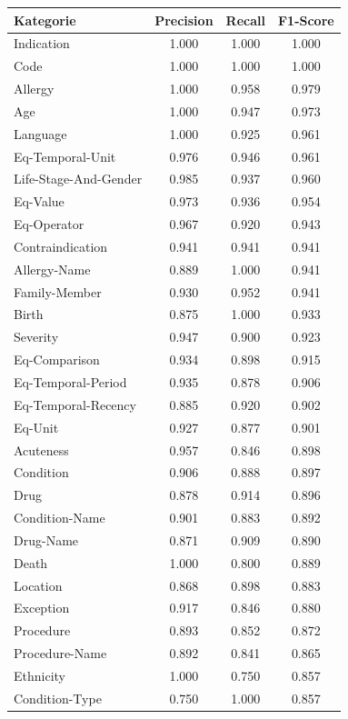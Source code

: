 \begin{table}[htbp]
\centering
\begin{tabular}{p{5cm}ccc}
\toprule
\textbf{Kategorie} & \textbf{Precision} & \textbf{Recall} & \textbf{F1-Score} \\
\midrule
Indication & 1.000 & 1.000 & 1.000 \\
Code & 1.000 & 1.000 & 1.000 \\
Allergy & 1.000 & 0.958 & 0.979 \\
Age & 1.000 & 0.947 & 0.973 \\
Language & 1.000 & 0.925 & 0.961 \\
Eq-Temporal-Unit & 0.976 & 0.946 & 0.961 \\
Life-Stage-And-Gender & 0.985 & 0.937 & 0.960 \\
Eq-Value & 0.973 & 0.936 & 0.954 \\
Eq-Operator & 0.967 & 0.920 & 0.943 \\
Contraindication & 0.941 & 0.941 & 0.941 \\
Allergy-Name & 0.889 & 1.000 & 0.941 \\
Family-Member & 0.930 & 0.952 & 0.941 \\
Birth & 0.875 & 1.000 & 0.933 \\
Severity & 0.947 & 0.900 & 0.923 \\
Eq-Comparison & 0.934 & 0.898 & 0.915 \\
Eq-Temporal-Period & 0.935 & 0.878 & 0.906 \\
Eq-Temporal-Recency & 0.885 & 0.920 & 0.902 \\
Eq-Unit & 0.927 & 0.877 & 0.901 \\
Acuteness & 0.957 & 0.846 & 0.898 \\
Condition & 0.906 & 0.888 & 0.897 \\
Drug & 0.878 & 0.914 & 0.896 \\
Condition-Name & 0.901 & 0.883 & 0.892 \\
Drug-Name & 0.871 & 0.909 & 0.890 \\
Death & 1.000 & 0.800 & 0.889 \\
Location & 0.868 & 0.898 & 0.883 \\
Exception & 0.917 & 0.846 & 0.880 \\
Procedure & 0.893 & 0.852 & 0.872 \\
Procedure-Name & 0.892 & 0.841 & 0.865 \\
Ethnicity & 1.000 & 0.750 & 0.857 \\
Condition-Type & 0.750 & 1.000 & 0.857 \\

\end{tabular}
\end{table}
